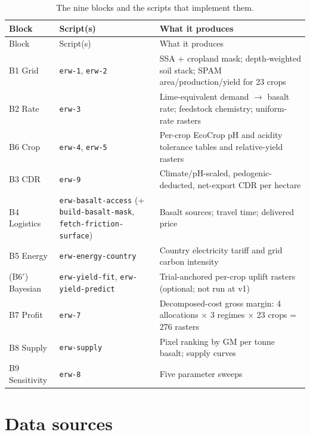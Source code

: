 \documentclass[openany]{book}
\begin{document}
\begin{longtable}[]{@{}l>{\raggedright\arraybackslash}p{3.7cm}>{\raggedright\arraybackslash}p{6.3cm}@{}}
\caption{The nine blocks and the scripts that implement them.}\label{tbl:blocks}\\
\toprule
Block & Script(s) & What it produces \\
\midrule
\endfirsthead
\toprule
Block & Script(s) & What it produces \\
\midrule
\endhead
B1 Grid & \texttt{erw-1}, \texttt{erw-2} & SSA + cropland mask; depth-weighted
soil stack; SPAM area/production/yield for 23 crops \\
B2 Rate & \texttt{erw-3} & Lime-equivalent demand $\rightarrow$ basalt rate;
feedstock chemistry; uniform-rate rasters \\
B6 Crop & \texttt{erw-4}, \texttt{erw-5} & Per-crop EcoCrop pH and acidity
tolerance tables and relative-yield rasters \\
B3 CDR & \texttt{erw-9} & Climate/pH-scaled, pedogenic-deducted, net-export
CDR per hectare \\
B4 Logistics & \texttt{erw-basalt-access} (+ \texttt{build-basalt-mask},
\texttt{fetch-friction-surface}) & Basalt sources; travel time; delivered
price \\
B5 Energy & \texttt{erw-energy-country} & Country electricity tariff and grid
carbon intensity \\
(B6$'$) Bayesian & \texttt{erw-yield-fit}, \texttt{erw-yield-predict} &
Trial-anchored per-crop uplift rasters (optional; not run at v1) \\
B7 Profit & \texttt{erw-7} & Decomposed-cost gross margin: 4 allocations
$\times$ 3 regimes $\times$ 23 crops = 276 rasters \\
B8 Supply & \texttt{erw-supply} & Pixel ranking by GM per tonne basalt; supply
curves \\
B9 Sensitivity & \texttt{erw-8} & Five parameter sweeps \\
\bottomrule
\end{longtable}

\section{Data sources}
\end{document}
